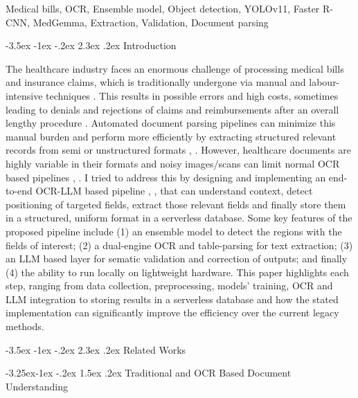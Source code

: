 \documentclass[conference,twocolumn]{IEEEtran}
\makeatletter
\renewcommand{\section}{\@startsection{section}{1}{\z@}%
  {-3.5ex \@plus -1ex \@minus -.2ex}%
  {2.3ex \@plus.2ex}%
  {\normalfont\large\bfseries\centering}}
\renewcommand{\subsection}{\@startsection{subsection}{2}{\z@}%
  {-3.25ex\@plus -1ex \@minus -.2ex}%
  {1.5ex \@plus .2ex}%
  {\normalfont\normalsize\bfseries\itshape}}
\makeatother
\begin{document}
\begin{IEEEkeywords}
Medical bills, OCR, Ensemble model, Object detection, YOLOv11, Faster R-CNN, MedGemma, Extraction, Validation, Document parsing
\end{IEEEkeywords}

\section{Introduction}

The healthcare industry faces an enormous challenge of processing
medical bills and insurance claims, which is traditionally undergone via
manual and labour-intensive techniques \cite{ref1}. This results in possible
errors and high costs, sometimes leading to denials and rejections of
claims and reimbursements after an overall lengthy procedure \cite{ref1}.
Automated document parsing pipelines can minimize this manual burden and
perform more efficiently by extracting structured relevant records from
semi or unstructured formats \cite{ref1}, \cite{ref2}. However, healthcare
documents are highly variable in their formats and noisy images/scans
can limit normal OCR based pipelines \cite{ref3}, \cite{ref4}. I tried to
address this by designing and implementing an end-to-end OCR-LLM based
pipeline \cite{ref3}, \cite{ref4}, \cite{ref5} that can understand context, detect
positioning of targeted fields, extract those relevant fields and
finally store them in a structured, uniform format in a serverless
database. Some key features of the proposed pipeline include (1) an
ensemble model to detect the regions with the fields of interest; (2) a
dual-engine OCR and table-parsing for text extraction; (3) an LLM based
layer for sematic validation and correction of outputs; and finally (4)
the ability to run locally on lightweight hardware. This paper
highlights each step, ranging from data collection, preprocessing,
models' training, OCR and LLM integration to storing results in a
serverless database and how the stated implementation can significantly
improve the efficiency over the current legacy methods.

\section{Related Works}

\subsection{Traditional and OCR Based Document Understanding}
\end{document}
